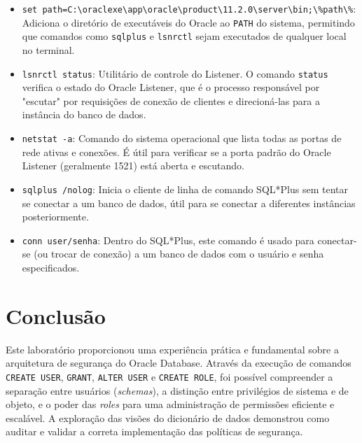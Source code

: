 \documentclass[a4paper, 12pt]{article}
\begin{document}
\begin{itemize}
    \item \texttt{set path=C:\textbackslash oraclexe\textbackslash app\textbackslash oracle\textbackslash product\textbackslash 11.2.0\textbackslash server\textbackslash bin;\textbackslash \%path\textbackslash \%}: \\Adiciona o diretório de executáveis do Oracle ao \texttt{PATH} do sistema, permitindo que comandos como \texttt{sqlplus} e \texttt{lsnrctl} sejam executados de qualquer local no terminal.
    \item \texttt{lsnrctl status}: Utilitário de controle do Listener. O comando \texttt{status} verifica o estado do Oracle Listener, que é o processo responsável por "escutar" por requisições de conexão de clientes e direcioná-las para a instância do banco de dados.
    \item \texttt{netstat -a}: Comando do sistema operacional que lista todas as portas de rede ativas e conexões. É útil para verificar se a porta padrão do Oracle Listener (geralmente 1521) está aberta e escutando.
    \item \texttt{sqlplus /nolog}: Inicia o cliente de linha de comando SQL*Plus sem tentar se conectar a um banco de dados, útil para se conectar a diferentes instâncias posteriormente.
    \item \texttt{conn user/senha}: Dentro do SQL*Plus, este comando é usado para conectar-se (ou trocar de conexão) a um banco de dados com o usuário e senha especificados.
\end{itemize}

\section{Conclusão}
Este laboratório proporcionou uma experiência prática e fundamental sobre a arquitetura de segurança do Oracle Database. Através da execução de comandos \texttt{CREATE USER}, \texttt{GRANT}, \texttt{ALTER USER} e \texttt{CREATE ROLE}, foi possível compreender a separação entre usuários (\textit{schemas}), a distinção entre privilégios de sistema e de objeto, e o poder das \textit{roles} para uma administração de permissões eficiente e escalável. A exploração das visões do dicionário de dados demonstrou como auditar e validar a correta implementação das políticas de segurança.
\end{document}
